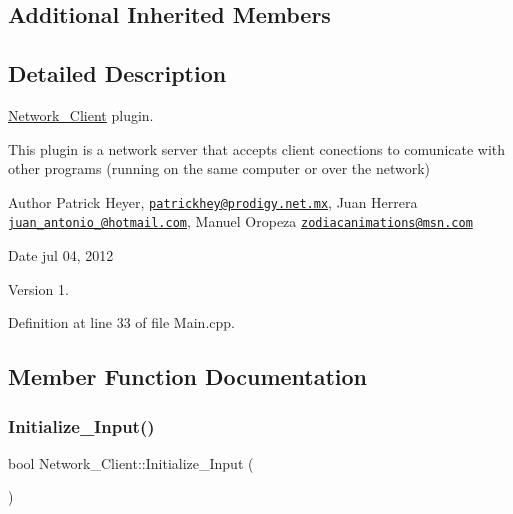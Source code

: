 \subsection*{Additional Inherited Members}


\subsection{Detailed Description}
\hyperlink{class_network___client}{Network\+\_\+\+Client} plugin. 

This plugin is a network server that accepts client conections to comunicate with other programs (running on the same computer or over the network) \begin{DoxyAuthor}{Author}
Patrick Heyer, \href{mailto:patrickhey@prodigy.net.mx}{\tt patrickhey@prodigy.\+net.\+mx}, Juan Herrera \href{mailto:juan_antonio_@hotmail.com}{\tt juan\+\_\+antonio\+\_\+@hotmail.\+com}, Manuel Oropeza \href{mailto:zodiacanimations@msn.com}{\tt zodiacanimations@msn.\+com} 
\end{DoxyAuthor}
\begin{DoxyDate}{Date}
jul 04, 2012 
\end{DoxyDate}
\begin{DoxyVersion}{Version}
1. 
\end{DoxyVersion}


Definition at line 33 of file Main.\+cpp.



\subsection{Member Function Documentation}
\mbox{\label{class_network___client_a429b34311701bc58b617c7e0675e70fa}} 
\subsubsection{\texorpdfstring{Initialize\+\_\+\+Input()}{Initialize\_Input()}}
{\footnotesize\ttfamily bool Network\+\_\+\+Client\+::\+Initialize\+\_\+\+Input (\begin{DoxyParamCaption}{ }\end{DoxyParamCaption})\hspace{0.3cm}{\ttfamily [virtual]}}



